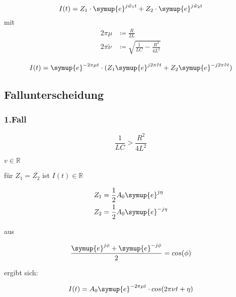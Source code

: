     \begin{equation}
        I(t) = Z_1 \cdot \symup{e}^{j \tilde{w}_1t} + Z_2 \cdot \symup{e}^{j\tilde{w}_2 t}
    \end{equation}
    mit 
    \begin{align}
        2 \pi \mu & \coloneq \frac{R}{2L} \\ 
        2 \pi \tilde{\nu} & \coloneq \sqrt{\frac{1}{LC} - \frac{R^2}{4L^2}}
    \end{align}

    \begin{equation}
        I(t) = \symup{e}^{- 2 \pi \mu t} \cdot  (Z_1 \symup{e}^{j 2\pi \tilde{v}t} + Z_2 \symup{e}^{-j 2\pi \tilde{v} t})
    \end{equation}

    \subsection{Fallunterscheidung}

        \subsubsection{1.Fall}

        \begin{equation}
            \frac{1}{LC} > \frac{R^2}{4L^2} 
        \end{equation}
        
        $v \in \mathds{R}$
       
        für $Z_1 = \overline{Z_2}$ ist $I(t) \in \mathds{R}$

        \begin{align}
            Z_1 & = \frac{1}{2} A_0 \symup{e}^{j \eta }\\
            Z_2 & = \frac{1}{2} A_0 \symup{e}^{-j \eta}
        \end{align}

        aus

        \begin{equation}
            \frac{\symup{e}^{j \phi} + \symup{e}^{-j \phi}}{2} = cos(\phi)
        \end{equation}

        ergibt sich:

        \begin{equation}
            I(t) = A_0 \symup{e}^{- 2 \pi \mu t} \cdot cos(2\pi \nu t + \eta)
        \end{equation}

